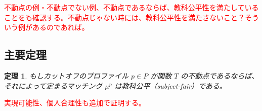 \documentclass[12pt, a4paper]{article}
\theoremstyle{definition}
\theoremstyle{remark}
\theoremstyle{plain}
\newtheorem{theorem}{定理}
\begin{document}
\textcolor{red}{不動点の例・不動点でない例、不動点であるならば、教科公平性を満たしていることをも確認する。不動点じゃない時には、教科公平性を満たさないこと？そういう例があるのであれば。}

\subsection{主要定理}




\begin{theorem}
もしカットオフのプロファイル \( p \in P\) が関数 \( T \) の不動点であるならば、それによって定まるマッチング \( \mu^{p} \) は教科公平（subject-fair）である。
\end{theorem}

\textcolor{red}{実現可能性、個人合理性も追加で証明する。}
\end{document}
